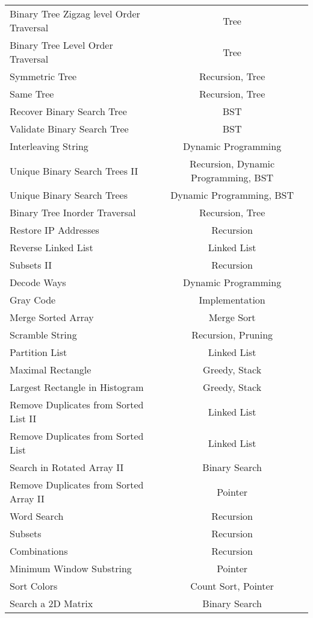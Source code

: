 \documentclass[paper=a4, fontsize=11pt]{scrartcl} %
\begin{document}
\begin{center}
\begin{longtable}{|l|c|}
    Binary Tree Zigzag level Order Traversal    &   Tree  \\
    Binary Tree Level Order Traversal   &   Tree  \\
    Symmetric Tree  &   Recursion, Tree   \\
    Same Tree   &   Recursion, Tree   \\
    Recover Binary Search Tree  &   BST \\
    Validate Binary Search Tree &   BST \\
    Interleaving String &   Dynamic Programming \\
    Unique Binary Search Trees II   &   Recursion, Dynamic Programming, BST \\
    Unique Binary Search Trees  &   Dynamic Programming, BST \\   
    Binary Tree Inorder Traversal   &   Recursion, Tree  \\
    Restore IP Addresses    &   Recursion  \\
    Reverse Linked List &   Linked List \\
    Subsets II  &   Recursion  \\
    Decode Ways &   Dynamic Programming \\
    Gray Code   &   Implementation  \\
    Merge Sorted Array  &   Merge Sort  \\
    Scramble String &   Recursion, Pruning \\
    Partition List  &   Linked List \\
    Maximal Rectangle   &   Greedy, Stack   \\
    Largest Rectangle in Histogram  &   Greedy, Stack  \\
    Remove Duplicates from Sorted List II &   Linked List \\
    Remove Duplicates from Sorted List  &   Linked List \\
    Search in Rotated Array II  &   Binary Search   \\
    Remove Duplicates from Sorted Array II  &  Pointer  \\
    Word Search &   Recursion  \\
    Subsets &   Recursion  \\
    Combinations    &   Recursion  \\
    Minimum Window Substring    &   Pointer \\
    Sort Colors &   Count Sort, Pointer  \\
    Search a 2D Matrix  &   Binary Search   \\

\end{longtable}
\end{center}
\end{document}
